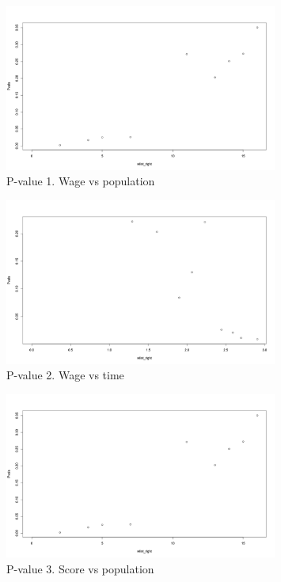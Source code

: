 \documentclass{article}
\begin{document}
\begin{figure}[H]
    \centering
    \includegraphics[width=0.8\textwidth]{figures/q1_pvalue1.png}
    \caption{P-value 1. Wage vs population}
    \label{fig:q1_pvalue_1}
\end{figure}

\begin{figure}[H]
    \centering
    \includegraphics[width=0.8\textwidth]{figures/q1_pvalue2.png}
    \caption{P-value 2. Wage vs time}
    \label{fig:q1_pvalue_2}
\end{figure}

\begin{figure}[H]
    \centering
    \includegraphics[width=0.8\textwidth]{figures/q1_pvalue3.png}
    \caption{P-value 3. Score vs population}
    \label{fig:q1_pvalue_3}
\end{figure}
\end{document}
